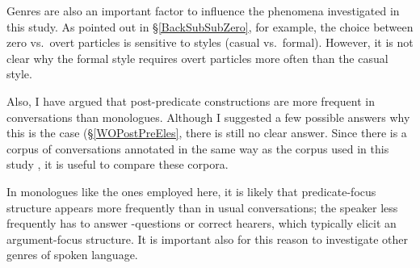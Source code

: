 Genres are also an important factor to influence the phenomena investigated in this study.
As pointed out in \S \ref{BackSubSubZero},
for example,
the choice between zero vs.~overt particles is sensitive to
styles (casual vs.~formal).
However, it is not clear why the formal style requires overt particles more often than
the casual style.

Also, I have argued that
post-predicate constructions are more frequent in conversations than monologues.
Although I suggested a few possible answers why this is the case (\S \ref{WOPostPreEles},
there is still no clear answer.
Since there is a corpus of conversations annotated in the same way as the corpus used in this study \cite{nakagawaden12},
it is useful to compare these corpora.

In monologues like the ones employed here,
it is likely that predicate-focus structure appears more frequently than in usual conversations;
 the speaker less frequently has to answer -questions or correct hearers, which typically elicit an argument-focus structure.
It is important also for this reason to investigate other genres of spoken language.



